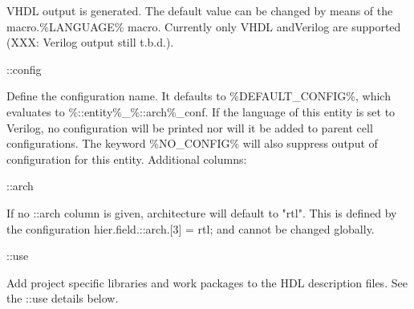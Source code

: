 \documentclass[a4paper,12pt]{article}
\begin{document}
\newline\hspace*{18mm}VHDL output is generated. The default value can be changed by means
\newline\hspace*{18mm}of the macro.\%LANGUAGE\% macro. Currently only VHDL and\newline\hspace*{18mm}Verilog are supported (XXX: Verilog output still t.b.d.).\newline
\begin{bf}::config\end{bf}\hspace*{6mm}Define the configuration name. It defaults to \%DEFAULT\_CONFIG\%, which
\newline\hspace*{18mm}evaluates to \%::entity\%\_\%::arch\%\_conf. If the language of this entity is set
\newline\hspace*{18mm}to Verilog, no configuration will be printed nor will it be added to parent cell
\newline\hspace*{18mm}configurations. The keyword \%NO\_CONFIG\% will also suppress output of
\newline\hspace*{18mm}configuration for this entity.\newline
Additional columns:\newline
\begin{bf}::arch\end{bf}\hspace*{9mm}If no ::arch column is given, architecture will default to "rtl". This is defined
\newline\hspace*{18mm}by the configuration hier.field.::arch.[3] = rtl; and cannot be changed globally.\newline
\begin{bf}::use\end{bf}\hspace*{11mm}Add project specific libraries and work packages to the HDL description files.
\newline\hspace*{18mm}See the ::use details below.
\end{document}
